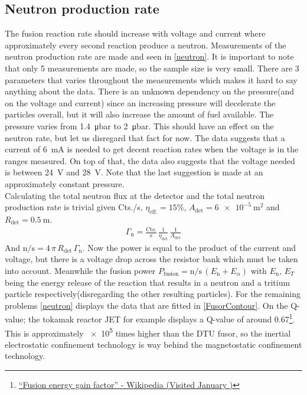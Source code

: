 \subsection{Neutron production rate}
The fusion reaction rate should increase with voltage and current where approximately every second reaction produce a neutron. Measurements of the neutron production rate are made and seen in \cref{neutron}. It is important to note that only 5 measurements are made, so the sample size is very small. There are 3 parameters that varies throughout the measurements which makes it hard to say anything about the data. There is an unknown dependency on the pressure(and on the voltage and current) since an increasing pressure will decelerate the particles overall, but it will also increase the amount of fuel available. The pressure varies from \SI{1.4}{\micro\bar} to \SI{2}{\micro\bar}. This should have an effect on the neutron rate, but let us disregard that fact for now. The data suggests that a current of \SI{6}{\milli\ampere} is needed to get decent reaction rates when the voltage is in the ranges measured. On top of that, the data also suggests that the voltage needed is between \SI{24}{\volt} and \SI{28}{\volt}. Note that the last suggestion is made at an approximately constant pressure.\\
Calculating the total neutron flux at the detector and the total neutron production rate is trivial given Cts./s,  \(\eta_{\mathrm{eff.}}=15\%\), \(A_{\mathrm{det}}=\SI{6e-5}{\meter\squared}\) and \(R_{\mathrm{det}}=\SI{0.5}{\meter}\).
\begin{align}
	\Gamma_{\mathrm{n}}=\frac{\mathrm{Cts.}}{\mathrm{s}}\,\frac{1}{\eta_{\mathrm{det}}}\,\frac{1}{A_{\mathrm{det}}}
\end{align}
And \(\mathrm{n}/\mathrm{s}=4\,\pi\, R_{\mathrm{det}}\,\Gamma_{\mathrm{n}}\). Now the power is equal to the product of the current and voltage, but there is a voltage drop across the resistor bank which must be taken into account. Meanwhile the fusion power \(P_{\mathrm{fusion}}=\mathrm{n}/\mathrm{s}\, (E_{\mathrm{n}}+E_{\alpha})\) with \(E_{\mathrm{n}},\,E_{T}\) being the energy release of the reaction that results in a neutron and a tritium particle respectively(disregarding the other resulting particles). For the remaining problems \cref{neutron} displays the data that are fitted in \cref{FusorContour}. On the Q-value; the tokamak reactor JET for example displays a Q-value of around 0.67\footnote{\href{https://en.wikipedia.org/wiki/Fusion_energy_gain_factor}{``Fusion energy gain factor'' - Wikipedia (Visited January )}}. This is approximately \SI{e5}{} times higher than the DTU fusor, so the inertial electrostatic confinement technology is way behind the magnetostatic confinement technology.
